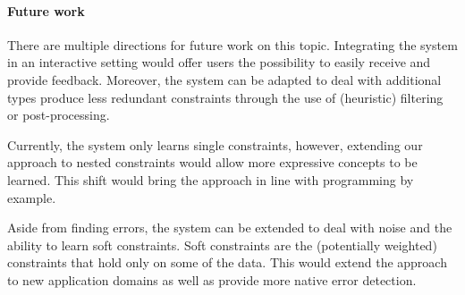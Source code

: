 \documentclass{IEEEtran}
\theoremstyle{definition}
\begin{document}
\paragraph{Future work}
There are multiple directions for future work on this topic.
Integrating the system in an interactive setting would offer users the possibility to easily receive and provide feedback.
Moreover, the system can be adapted to deal with additional types produce less redundant constraints through the use of (heuristic) filtering or post-processing.

Currently, the system only learns single constraints, however, extending our approach to nested constraints would allow more expressive concepts to be learned.
This shift would bring the approach in line with programming by example.

Aside from finding errors, the system can be extended to deal with noise and the ability to learn soft constraints.
Soft constraints are the (potentially weighted) constraints that hold only on some of the data.
This would extend the approach to new application domains as well as provide more native error detection.



\end{document}
